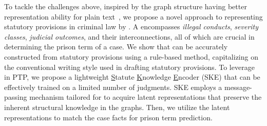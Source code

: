 
To tackle the challenges above, inspired by the graph structure having better representation ability for plain text~\cite{card1999readings,wang-etal-2022-d2gclf,gao-etal-2023-dialogue}, we propose a novel approach to representing statutory provisions in criminal law by \emph{}. A \lawgraph{} encompasses \textit{illegal conducts}, \textit{severity classes}, \textit{judicial outcomes}, and their interconnections, all of which are crucial in determining the prison term of a case. We show that  can be accurately constructed from statutory provisions using a rule-based method, capitalizing on the conventional writing style used in drafting statutory provisions. To leverage  in PTP, we propose a lightweight \underline{S}tatute \underline{K}nowledge \underline{E}ncoder (SKE) that can be effectively trained on a limited number of judgments. SKE employs a message-passing mechanism tailored for  to acquire latent representations that preserve the inherent structural knowledge in the graphs. Then, we utilize the latent representations to match the case facts for prison term prediction. 

